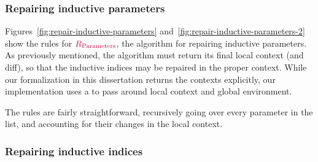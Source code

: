 \subsubsection{Repairing inductive parameters}





Figures~\ref{fig:repair-inductive-parameters}
and~\ref{fig:repair-inductive-parameters-2} show the rules for
$\textcolor{purple}{R_{\text{Parameters}}}{}$, the algorithm for repairing inductive parameters.  As
previously mentioned, the algorithm must return its final local context (and
diff), so that the inductive indices may be repaired in the proper context.
While our formalization in this dissertation returns the contexts explicitly,
our implementation uses a  to pass around local context and
global environment.

The rules are fairly straightforward, recursively going over every parameter in
the list, and accounting for their changes in the local context.

\subsubsection{Repairing inductive indices}



% 

% 
